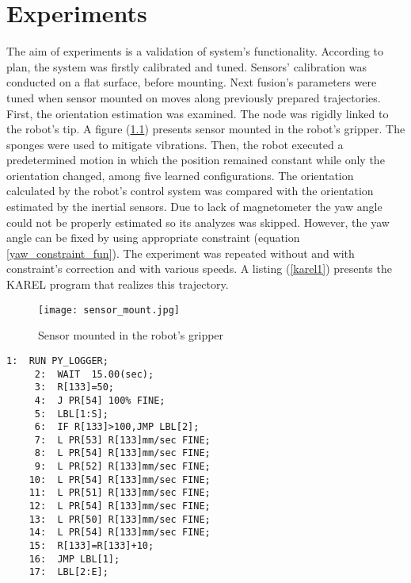 \chapter{Experiments}

The aim of experiments is a validation of system's functionality. According to plan, the system was firstly calibrated and tuned. Sensors' calibration was conducted on a flat surface, before mounting. Next fusion's parameters were tuned when sensor mounted on moves along previously prepared trajectories.\\

 First, the orientation estimation was examined. The node was rigidly linked to the robot's tip. A figure (\ref{sensor_mount}) presents sensor mounted in the robot's gripper. The sponges were used to mitigate vibrations.  Then, the robot executed a predetermined motion in which the position remained constant while only the orientation changed, among five learned configurations. The orientation calculated by the robot's control system was compared with the orientation estimated by the inertial sensors. Due to lack of magnetometer the yaw angle could not be properly estimated so its analyzes was skipped. However, the yaw angle can be fixed by using appropriate constraint (equation \ref{yaw_constraint_fun}). The experiment was repeated without and with constraint's correction and with various speeds. A listing (\ref{karel1}) presents the KAREL program that realizes this trajectory.
 
 \begin{figure}[!h]
 	\centering
 	\texttt{[image: sensor\_mount.jpg]}
 	\caption{Sensor mounted in the robot's gripper}
 	\label{sensor_mount}
 \end{figure}
 
 \begin{lstlisting}[caption={The KAREL program realizing an orientation changes}, captionpos=t, label=karel1]
	 1:  RUN PY_LOGGER;
	 2:  WAIT  15.00(sec);
	 3:  R[133]=50;
	 4:  J PR[54] 100% FINE;
	 5:  LBL[1:S];
	 6:  IF R[133]>100,JMP LBL[2];
	 7:  L PR[53] R[133]mm/sec FINE;
	 8:  L PR[54] R[133]mm/sec FINE;
	 9:  L PR[52] R[133]mm/sec FINE;
	10:  L PR[54] R[133]mm/sec FINE;
	11:  L PR[51] R[133]mm/sec FINE;
	12:  L PR[54] R[133]mm/sec FINE;
	13:  L PR[50] R[133]mm/sec FINE;
	14:  L PR[54] R[133]mm/sec FINE;
	15:  R[133]=R[133]+10;
	16:  JMP LBL[1];
	17:  LBL[2:E];
 \end{lstlisting}


